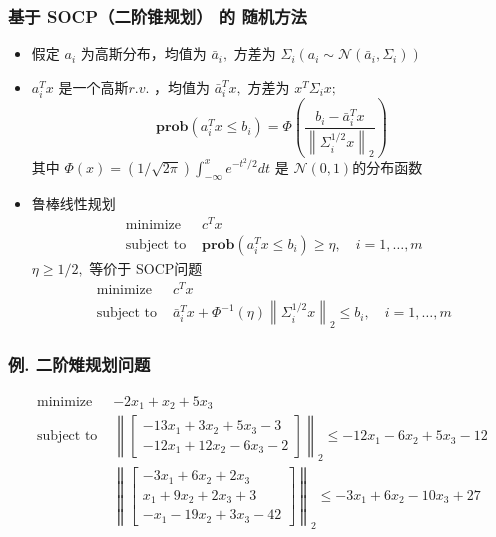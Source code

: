 \documentclass[handout]{beamer}
\begin{document}
\begin{frame}
\begin{frame}
		\frametitle{基于 SOCP（二阶锥规划） 的 随机方法 }
		\begin{itemize}[<+->]
			\item 假定 $a_{i}$ 为高斯分布，均值为 $\bar{a}_{i},$ 方差为 $\Sigma_{i}\left(a_{i} \sim \mathcal{N}\left(\bar{a}_{i}, \Sigma_{i}\right)\right)$
			\item $a_{i}^{T} x$ 是一个高斯$r . v .$ ，均值为 $\bar{a}_{i}^{T} x,$ 方差为 $x^{T} \Sigma_{i} x ;$ 
			\begin{equation}
				\textbf{prob}\left(a_{i}^{T} x \leq b_{i}\right)=\Phi\left(\frac{b_{i}-\bar{a}_{i}^{T} x}{\left\|\Sigma_{i}^{1 / 2} x\right\|_{2}}\right)
			\end{equation}
			其中 $\Phi(x)=(1 / \sqrt{2 \pi}) \int_{-\infty}^{x} e^{-t^{2} / 2} d t$ 是 $\mathcal{N}(0,1)$的分布函数\\
			\item 鲁棒线性规划
			\begin{equation}
				\begin{array}{ll}
					\text{ minimize } & c^{T} x \\
					\text { subject to } & \textbf {prob}\left(a_{i}^{T} x \leq b_{i}\right) \geq \eta, \quad i=1, \ldots, m
				\end{array}
			\end{equation}
			$\eta \geq 1 / 2,$ 等价于 SOCP问题
			\begin{equation}
				\begin{array}{ll}
					\text{ minimize } & c^{T} x \\
					\text { subject to } & \bar{a}_{i}^{T} x+\Phi^{-1}(\eta)\left\|\Sigma_{i}^{1 / 2} x\right\|_{2} \leq b_{i}, \quad i=1, \ldots, m
				\end{array}
			\end{equation}
		\end{itemize}
	\end{frame}
	
	
	\begin{frame}
		\frametitle{  例. 二阶雉规划问题}
		$$
		\begin{aligned}
			\text { minimize } & -2 x_1+x_2+5 x_3 \\
			\text { subject to } & \left\|\left[\begin{array}{c}
				-13 x_1+3 x_2+5 x_3-3 \\
				-12 x_1+12 x_2-6 x_3-2
			\end{array}\right]\right\|_2 \leqslant-12 x_1-6 x_2+5 x_3-12 \\
			& \left\|\left[ \begin{array}{c}
				-3 x_1+6 x_2+2 x_3 \\
				x_1+9 x_2+2 x_3+3 \\
				-x_1-19 x_2+3 x_3-42
			\end{array}\right] \right\|_2 \leqslant-3 x_1+6 x_2-10 x_3+27
		\end{aligned}
		$$
		

\end{frame}
\end{frame}
\end{document}
